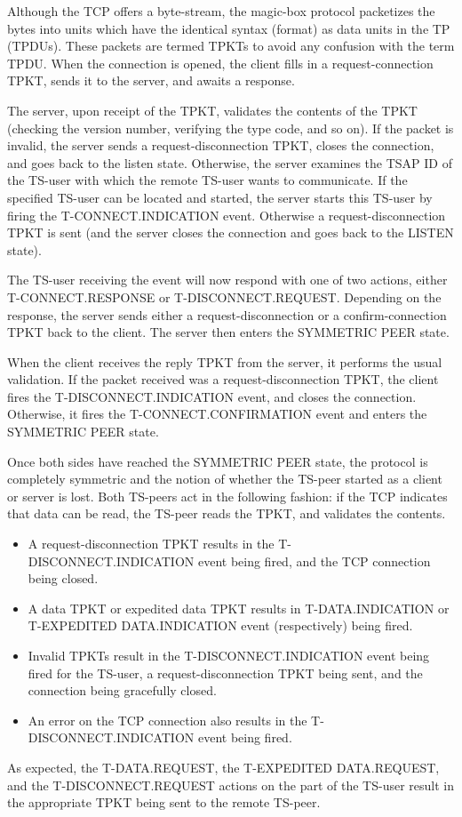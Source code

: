 Although the TCP offers a byte-stream,
the magic-box protocol packetizes the bytes into units which have the
identical syntax (format) as data units in the TP (TPDUs).
These packets are termed TPKTs to avoid any confusion with the term TPDU.
When the connection is opened,
the client fills in a request-connection TPKT, sends it to the server, and
awaits a response.

The server, upon receipt of the TPKT,
validates the contents of the TPKT
(checking the version number, verifying the type code, and so on).
If the packet is invalid,
the server sends a request-disconnection TPKT,
closes the connection, and goes back to the listen state.
Otherwise,
the server examines the TSAP ID of the TS-user with which the remote TS-user
wants to communicate.
If the specified TS-user can be located and started,
the server starts this TS-user by firing the {\sf T-CONNECT.INDICATION\/}
event.
Otherwise a request-disconnection TPKT is sent
(and the server closes the connection and goes back to the LISTEN state).

The TS-user receiving the event will now respond with one of two actions,
either {\sf T-CONNECT.RESPONSE\/} or {\sf T-DISCONNECT.REQUEST}.
Depending on the response,
the server sends either a request-disconnection or a confirm-connection
TPKT back to the client.
The server then enters the SYMMETRIC PEER state.

When the client receives the reply TPKT from the server,
it performs the usual validation.
If the packet received was a request-disconnection TPKT,
the client fires the {\sf T-DISCONNECT.INDICATION\/} event,
and closes the connection.
Otherwise,
it fires the {\sf T-CONNECT.CONFIRMATION\/} event
and enters the SYMMETRIC PEER state.

Once both sides have reached the SYMMETRIC PEER state,
the protocol is completely symmetric and the notion of whether the TS-peer
started as a client or server is lost.
Both TS-peers act in the following fashion:
if the TCP indicates that data can be read,
the TS-peer reads the TPKT, and validates the contents.
\begin{itemize}
\item	A request-disconnection TPKT results in the
{\sf T-DISCONNECT.INDICATION\/} event being fired, and the TCP connection
being closed.

\item	A data TPKT or expedited data TPKT results in {\sf T-DATA.INDICATION\/}
or {\sf T-EXPEDITED DATA.INDICATION\/} event (respectively) being fired.

\item	Invalid TPKTs result in the {\sf T-DISCONNECT.INDICATION\/} event
being fired for the TS-user,
a request-disconnection TPKT being sent,
and the connection being gracefully closed.

\item	An error on the TCP connection also results in the
{\sf T-DISCONNECT.INDICATION\/} event being fired.
\end{itemize}
As expected,
the {\sf T-DATA.REQUEST}, the {\sf T-EXPEDITED DATA.REQUEST},
and the {\sf T-DISCONNECT.REQUEST\/} actions on the part of the TS-user
result in the appropriate TPKT being sent to the remote TS-peer.

